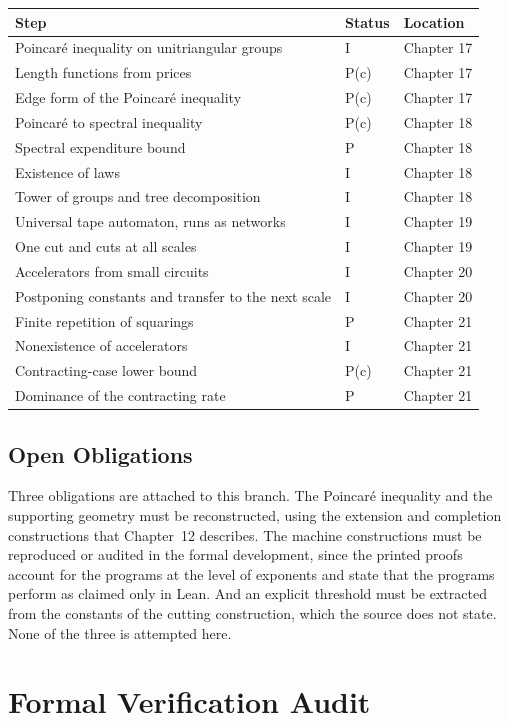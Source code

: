 \documentclass[11pt,letterpaper]{report}
\theoremstyle{plain}
\theoremstyle{definition}
\theoremstyle{remark}
\begin{document}
\begin{longtable}{p{}p{}p{}}
\hline
Step & Status & Location\\
\hline
\endhead
Poincar\'e inequality on unitriangular groups & I & Chapter 17\\
Length functions from prices & P(c) & Chapter 17\\
Edge form of the Poincar\'e inequality & P(c) & Chapter 17\\
Poincar\'e to spectral inequality & P(c) & Chapter 18\\
Spectral expenditure bound & P & Chapter 18\\
Existence of laws & I & Chapter 18\\
Tower of groups and tree decomposition & I & Chapter 18\\
Universal tape automaton, runs as networks & I & Chapter 19\\
One cut and cuts at all scales & I & Chapter 19\\
Accelerators from small circuits & I & Chapter 20\\
Postponing constants and transfer to the next scale & I & Chapter 20\\
Finite repetition of squarings & P & Chapter 21\\
Nonexistence of accelerators & I & Chapter 21\\
Contracting-case lower bound & P(c) & Chapter 21\\
Dominance of the contracting rate & P & Chapter 21\\
\hline
\end{longtable}

\section{Open Obligations}

Three obligations are attached to this branch. The Poincar\'e inequality and the supporting geometry must be reconstructed, using the extension and completion constructions that Chapter~12 describes. The machine constructions must be reproduced or audited in the formal development, since the printed proofs account for the programs at the level of exponents and state that the programs perform as claimed only in Lean. And an explicit threshold must be extracted from the constants of the cutting construction, which the source does not state. None of the three is attempted here.

\chapter{Formal Verification Audit}
\end{document}
